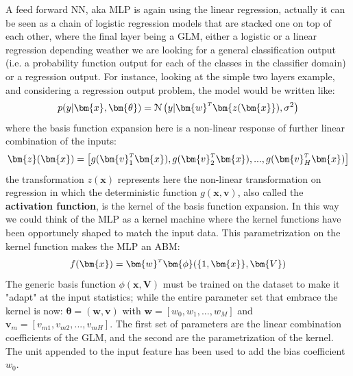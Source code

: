 


A feed forward NN, aka \ac{MLP} is again using the linear regression, actually it can be seen as a chain of logistic regression models that are stacked one on top of each other, where the final layer being a \ac{GLM}, either a logistic or a linear regression depending weather we are looking for a general classification output (i.e. a probability function output for each of the classes in the classifier domain) or a regression output. 
For instance, looking at the simple two layers example, and considering a regression output problem, the model would be written like:
\begin{equation}
    p(y|\bm{x},\bm{\theta}) = \mathcal{N}\left(y|\transpose{\bm{w}}\bm{z(\bm{x}}), \sigma^2 \right)
    \label{eq:mlp_a}
\end{equation}
where the basis function expansion here is a non-linear response of further linear combination of the inputs:
\begin{equation}
    \bm{z}(\bm{x}) = \left[ g(\transpose{\bm{v}_1}\bm{x}), g(\transpose{\bm{v}_2}\bm{x}), ..., g(\transpose{\bm{v}_H}\bm{x})
    \right]
    \label{eq:mlp_b}
\end{equation}
the transformation $z(\bm{x})$ represents here the non-linear transformation on regression in which the deterministic function $g(\bm{x},\bm{v})$, also called the \textbf{activation function}, is the kernel of the basis function expansion. In this way we could think of the \acl{MLP} as a kernel machine where the kernel functions have been opportunely shaped to match the input data. This parametrization on the kernel function makes the \acl{MLP} an \ac{ABM}:
\begin{equation}
    f(\bm{x}) = \transpose{\bm{w}}\bm{\phi}(\{1,\bm{x}\}, \bm{V})
\end{equation}
The generic basis function $\phi(\bm{x},\bm{V})$ must be trained on the dataset to make it "adapt" at the input statistics; while
the entire parameter set that embrace the kernel is now: $\bm{\theta} = (\bm{w}, \bm{v})$ with $\bm{w} = [w_0, w_1, ..., w_M]$ and $\bm{v}_m = [v_{m1}, v_{m2}, ..., v_{mH}]$. The first set of parameters are the linear combination coefficients of the \ac{GLM}, and the second are the parametrization of the kernel. The unit appended to the input feature has been used to add the bias coefficient $w_0$.


